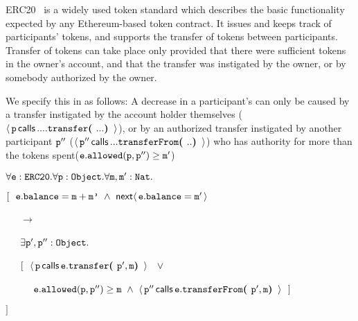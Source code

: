  
 ERC20~\cite{ERC20} is a widely used token standard which describes the 
 basic functionality expected by any    Ethereum-based token contract. 
 It issues and keeps track of participants' tokens, and supports the  transfer
 of tokens between participants. 
%
%
Transfer of tokens 
 can   take place only provided that  there were sufficient tokens in the
 owner's account, and that
 the transfer was instigated by the owner, or by somebody authorized
 by the owner.

We specify this in \Chainmail as follows:
%
%
A decrease in  a participant's  
can only be caused by a transfer instigated by the 
account holder themselves (\ie $\Calls {\prg{p}} {\prg{transfer}} {...} {...}$), or by
an authorized transfer instigated by another participant $\prg{p}''$  (\ie $\Calls {\prg{p}''} {{\prg{transferFrom}} } {..} {..}$) who 
has authority for more than the tokens spent(\ie  $\prg{e}.\prg{allowed}(\prg{p},\prg{p}'')\geq \prg{m}'$)

\vspace{.15cm}
\noindent
$\forall \prg{e}:\prg{ERC20}.\forall \prg{p}:\prg{Object}.\forall \prg{m},\prg{m}':\prg{Nat}.$\\
\strut \hspace{0.3cm} $[\ \ \prg{e}.\prg{balance}=\prg{m}+\prg{m'}\ \wedge \ \Next{\prg{e}.\prg{balance}=\prg{m}'}$ \\ %
\strut \hspace{0.4cm} \ \ \ $\longrightarrow$\\
\strut \hspace{0.4cm} \ \ \ $\exists \prg{p}',\prg{p}'':\prg{Object}.$ \\
\strut \hspace{0.4cm} \ \ \  $[\ \  \Calls{\prg{p}} {\prg{transfer}}  {\prg{e}}  {\prg{p}',\prg{m}} \  \  \ \vee\, $\\
\strut \hspace{0.4cm} \ \ \   $\ \ \ \ \prg{e}.\prg{allowed}(\prg{p},\prg{p}'')\geq \prg{m} \ \wedge \ \Calls{\prg{p}''} {\prg{transferFrom}}  {\prg{e}}  {\prg{p}',\prg{m}}\       \  ]$\\
\strut \hspace{0.3cm} $] $
\vspace{.15cm}

